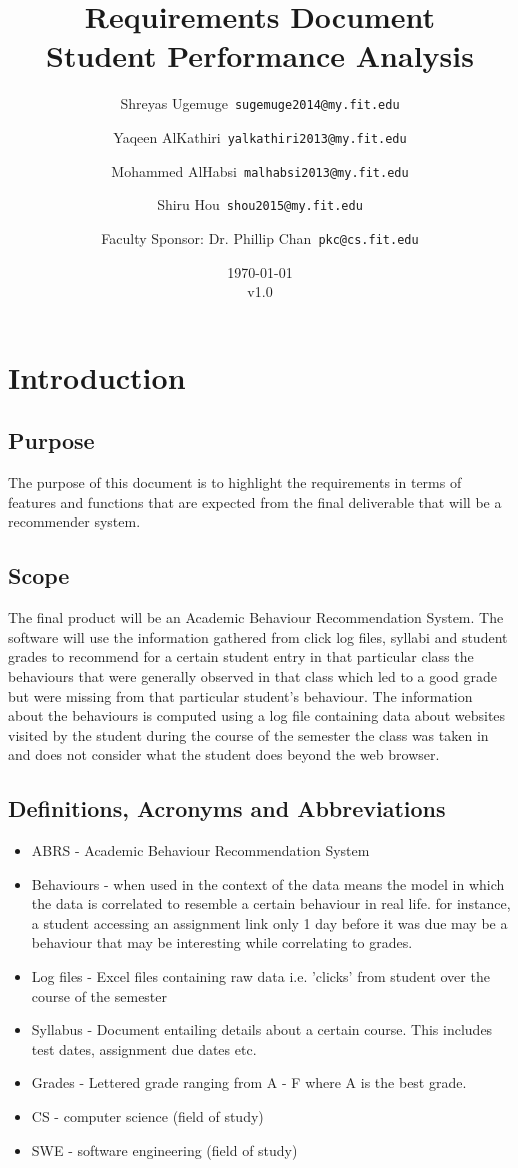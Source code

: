 \documentclass[12pt]{article}
\title{\textbf{Requirements Document} \\ \hfill \break
	Student Performance Analysis}
\author{Shreyas Ugemuge\      \texttt{sugemuge2014@my.fit.edu}
  \and
  Yaqeen AlKathiri\      \texttt{yalkathiri2013@my.fit.edu}
  \and
	Mohammed AlHabsi\      \texttt{malhabsi2013@my.fit.edu}
  \and
  Shiru Hou\      \texttt{shou2015@my.fit.edu}
  \and
  Faculty Sponsor: Dr. Phillip Chan\      \texttt{pkc@cs.fit.edu}}
\date{\today \\ v1.0}
\begin{document}
	\singlespacing
	\maketitle \pagebreak \tableofcontents \pagebreak
	\section{Introduction}
	\subsection{Purpose} \label{purpose}
	The purpose of this document is to highlight the requirements in terms of features and functions that are expected from the final deliverable that will be a recommender system. 
	\subsection{Scope} \label{scope}
	The final product will be an Academic Behaviour Recommendation System. The software will use the information gathered from click log files, syllabi and student grades to recommend for a certain student entry in that particular class the behaviours that were generally observed in that class which led to a good grade but were missing from that particular student's behaviour. The information about the behaviours is computed using a log file containing data about websites visited by the student during the course of the semester the class was taken in and does not consider what the student does beyond the web browser.
	\subsection{Definitions, Acronyms and Abbreviations} \label{defs}
	\begin{itemize}
		\item ABRS - Academic Behaviour Recommendation System
		\item Behaviours - when used in the context of the data means the model in which the data is correlated to resemble a certain behaviour in real life. for instance, a student accessing an assignment link only 1 day before it was due may be a behaviour that may be interesting while correlating to grades. 
		\item Log files - Excel files containing raw data i.e. 'clicks' from student over the course of the semester
		\item Syllabus - Document entailing details about a certain course. This includes test dates, assignment due dates etc.
		\item Grades - Lettered grade ranging from A - F where A is the best grade.
		\item CS - computer science (field of study)
		\item SWE - software engineering (field of study)
	\end{itemize}
\end{document}
